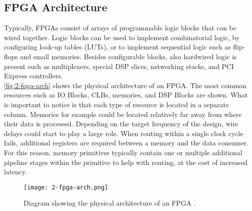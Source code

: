 \subsection{FPGA Architecture}
\label{sec:fpga-arch}
Typically, FPGAs consist of arrays of programmable logic blocks that can be wired together. Logic blocks can be used to implement combinatorial logic, by configuring look-up tables (LUTs), or to implement sequential logic such as flip-flops and small memories. Besides configurable blocks, also hardwired logic is present such as multiplexers, special DSP slices, networking stacks, and PCI Express controllers.\\
\autoref{fig:2-fpga-arch} shows the physical architecture of an FPGA. The most common resources such as IO Blocks, CLBs, memories, and DSP Blocks are shown. What is important to notice is that each type of resource is located in a separate column. Memories for example could be located relatively far away from where their data is processed. Depending on the target frequency of the design, wire delays could start to play a large role. When routing within a single clock cycle fails, additional registers are required between a memory and the data consumer. For this reason, memory primitives typically contain one or multiple additional pipeline stages within the primitive to help with routing, at the cost of increased latency.

\begin{figure}[H]
  \centering
  \texttt{[image: 2-fpga-arch.png]}
  \caption{Diagram showing the physical architecture of an FPGA \cite{fpga-fig}.}
  \label{fig:2-fpga-arch}
\end{figure}



